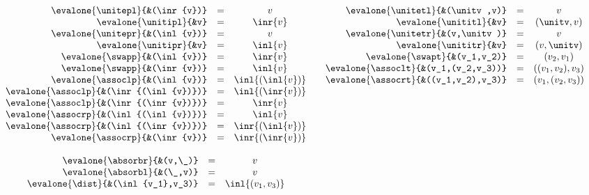 \begin{figure}[ht]
{\footnotesize
\[\begin{array}{cc}
\begin{array}[t]{rlcl}
\evalone{\unitepl}{&(\inr{v})} &=& v \\
\evalone{\unitipl}{&v} &=& \inr{v} \\
\evalone{\unitepr}{&(\inl{v})} &=& v \\
\evalone{\unitipr}{&v} &=& \inl{v} \\
\evalone{\swapp}{&(\inl{v})} &=& \inr{v} \\
\evalone{\swapp}{&(\inr{v})} &=& \inl{v} \\
\evalone{\assoclp}{&(\inl{v})} &=& \inl{(\inl{v})} \\
\evalone{\assoclp}{&(\inr{(\inl{v})})} &=& \inl{(\inr{v})} \\
\evalone{\assoclp}{&(\inr{(\inr{v})})} &=& \inr{v} \\
\evalone{\assocrp}{&(\inl{(\inl{v})})} &=& \inl{v} \\
\evalone{\assocrp}{&(\inl{(\inr{v})})} &=& \inr{(\inl{v})} \\
\evalone{\assocrp}{&(\inr{v})} &=& \inr{(\inr{v})}
\end{array} &
\begin{array}[t]{rlcl}
\evalone{\unitetl}{&(\unitv,v)} &=& v \\
\evalone{\unititl}{&v} &=& (\unitv,v) \\
\evalone{\unitetr}{&(v,\unitv)} &=& v \\
\evalone{\unititr}{&v} &=& (v,\unitv) \\
\evalone{\swapt}{&(v_1,v_2)} &=& (v_2,v_1) \\
\evalone{\assoclt}{&(v_1,(v_2,v_3))} &=& ((v_1,v_2),v_3) \\
\evalone{\assocrt}{&((v_1,v_2),v_3)} &=& (v_1,(v_2,v_3))
\end{array} \\
\\
\begin{array}[t]{rlcl}
\evalone{\absorbr}{&(v,\_)} &=& v \\
\evalone{\absorbl}{&(\_,v)} &=& v \\
\evalone{\dist}{&(\inl{v_1},v_3)} &=& \inl{(v_1,v_3)} \\

\end{array}
\end{array}\]}
\end{figure}
